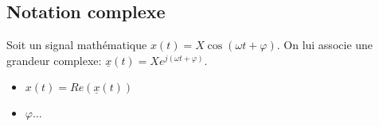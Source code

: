 \subsection{Notation complexe}

\begin{defi}
Soit un signal mathématique $x(t)=X \cos\left( \omega t + \varphi \right)$. On lui associe 
une grandeur complexe: $\underline{x}(t)=X e^{j\left(\omega t + \varphi\right)}$.
\end{defi}

\begin{resultat}
\begin{itemize}
\item $x(t) = Re\left(\underline{x}(t)\right)$
\item $\varphi ... $
\end{itemize}
\end{resultat}